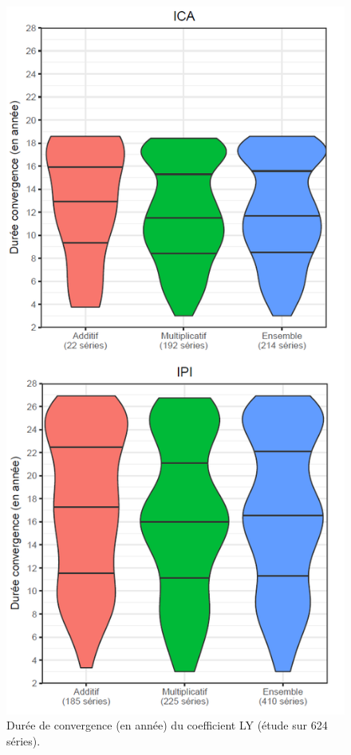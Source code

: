 \documentclass[12pt, a4paper, french]{article}
\begin{document}
\begin{figure}[!ht]
\begin{center}
 \includegraphics[scale=0.65]{img/LYconvergence2.png}
 \caption{Durée de convergence (en année) du coefficient LY (étude sur 624 séries).}
 \label{fig:LYconvergence}
\end{center}
\end{figure}
\end{document}
